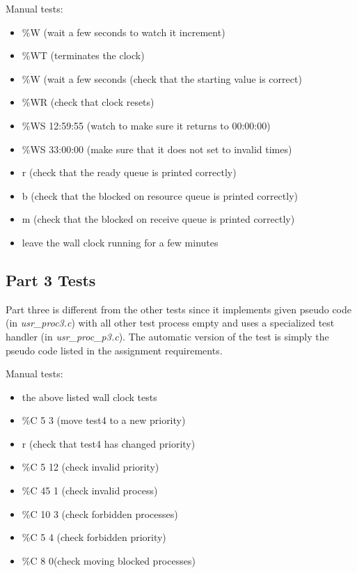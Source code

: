 \documentclass[11pt, oneside]{article}
\begin{document}
Manual tests:
\begin{itemize}
    \item \%W (wait a few seconds to watch it increment)
    \item \%WT (terminates the clock)
    \item \%W (wait a few seconds (check that the starting value is correct)
    \item \%WR (check that clock resets)
    \item \%WS 12:59:55 (watch to make sure it returns to 00:00:00)
    \item \%WS 33:00:00 (make sure that it does not set to invalid times)
    \item r (check that the ready queue is printed correctly)
    \item b (check that the blocked on resource queue is printed correctly)
    \item m (check that the blocked on receive queue is printed correctly)
    \item leave the wall clock running for a few minutes
\end{itemize}

\subsection{Part 3 Tests}
Part three is different from the other tests since it implements given pseudo code (in \textit{usr\_proc3.c}) with all other test process empty and uses a specialized test handler (in \textit{usr\_proc\_p3.c}). The automatic version of the test is simply the pseudo code listed in the assignment requirements.

Manual tests:
\begin{itemize}
     \item the above listed wall clock tests
     \item \%C 5 3 (move test4 to a new priority)
     \item r (check that test4 has changed priority)
     \item \%C 5 12 (check invalid priority)
     \item \%C 45 1 (check invalid process)
     \item \%C 10 3 (check forbidden processes)
     \item \%C 5 4 (check forbidden priority)
     \item \%C 8 0(check moving blocked processes)
 \end{itemize}
\end{document}

